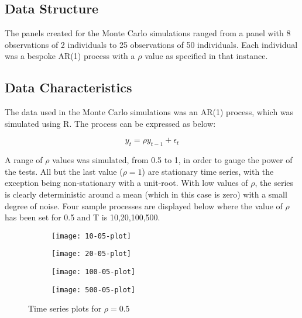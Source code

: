 \subsection{Data Structure}

The panels created for the Monte Carlo simulations ranged from a panel with 8 observations of 2 individuals to 25 observations of 50 individuals. Each individual was a bespoke AR(1) process with a $\rho$ value as specified in that instance.


\subsection{Data Characteristics}

The data used in the Monte Carlo simulations was an AR(1) process, which was simulated using R. The process can be expressed as below:

\begin{equation}
y_t = \rho y_{t-1} + \epsilon_t
\end{equation}

A range of $\rho$ values was simulated, from 0.5 to 1, in order to gauge the power of the tests. All but the last value ($\rho = 1$) are stationary time series, with the exception being non-stationary with a unit-root. With low values of $\rho$, the series is clearly deterministic around a mean (which in this case is zero) with a small degree of noise. Four sample processes are displayed below where the value of $\rho$ has been set for 0.5 and T is 10,20,100,500.

\begin{figure}[htp]
	\centering
	\begin{subfigure}{0.23\textwidth}
		\centering
		\texttt{[image: 10-05-plot]}
	\end{subfigure}
	\begin{subfigure}{0.23\textwidth}
		\centering
		\texttt{[image: 20-05-plot]}
	\end{subfigure}
	\begin{subfigure}{0.23\textwidth}
		\centering
		\texttt{[image: 100-05-plot]}
	\end{subfigure}
	\begin{subfigure}{0.23\textwidth}
		\centering
		\texttt{[image: 500-05-plot]}
	\end{subfigure}
\caption{Time series plots for $\rho = 0.5$}
\end{figure}



